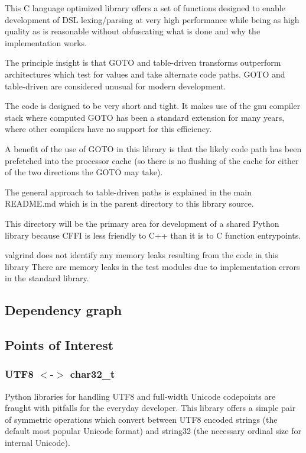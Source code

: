 This C language optimized library offers a set of functions designed to enable development of D\+S\+L lexing/parsing at very high performance while being as high quality as is reasonable without obfuscating what is done and why the implementation works.

The principle insight is that G\+O\+T\+O and table-\/driven transforms outperform architectures which test for values and take alternate code paths. G\+O\+T\+O and table-\/driven are considered unusual for modern development.

The code is designed to be very short and tight. It makes use of the gnu compiler stack where computed G\+O\+T\+O has been a standard extension for many years, where other compilers have no support for this efficiency.

A benefit of the use of G\+O\+T\+O in this library is that the likely code path has been prefetched into the processor cache (so there is no flushing of the cache for either of the two directions the G\+O\+T\+O may take).

The general approach to table-\/driven paths is explained in the main R\+E\+A\+D\+M\+E.\+md which is in the parent directory to this library source.

This directory will be the primary area for development of a shared Python library because C\+F\+F\+I is less friendly to C++ than it is to C function entrypoints.

valgrind does not identify any memory leaks resulting from the code in this library There are memory leaks in the test modules due to implementation errors in the standard library.

\subsection*{Dependency graph}



\subsection*{Points of Interest}

\subsubsection*{U\+T\+F8 $<$-\/$>$ char32\+\_\+t}

Python libraries for handling U\+T\+F8 and full-\/width Unicode codepoints are fraught with pitfalls for the everyday developer. This library offers a simple pair of symmetric operations which convert between U\+T\+F8 encoded strings (the default most popular Unicode format) and string32 (the necessary ordinal size for internal Unicode).

